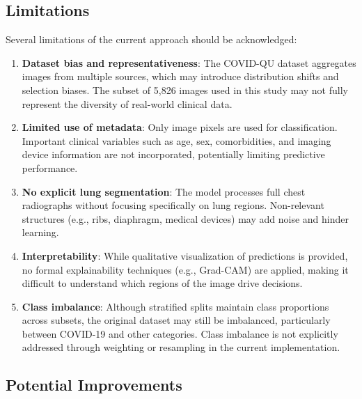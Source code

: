 \documentclass[conference]{IEEEtran}
\begin{document}
\subsection{Limitations}

Several limitations of the current approach should be acknowledged:
\begin{enumerate}
    \item \textbf{Dataset bias and representativeness}: The COVID-QU dataset aggregates images from multiple sources, which may introduce distribution shifts and selection biases. The subset of 5{,}826 images used in this study may not fully represent the diversity of real-world clinical data.
    \item \textbf{Limited use of metadata}: Only image pixels are used for classification. Important clinical variables such as age, sex, comorbidities, and imaging device information are not incorporated, potentially limiting predictive performance.
    \item \textbf{No explicit lung segmentation}: The model processes full chest radiographs without focusing specifically on lung regions. Non-relevant structures (e.g., ribs, diaphragm, medical devices) may add noise and hinder learning.
    \item \textbf{Interpretability}: While qualitative visualization of predictions is provided, no formal explainability techniques (e.g., Grad-CAM) are applied, making it difficult to understand which regions of the image drive decisions.
    \item \textbf{Class imbalance}: Although stratified splits maintain class proportions across subsets, the original dataset may still be imbalanced, particularly between COVID-19 and other categories. Class imbalance is not explicitly addressed through weighting or resampling in the current implementation.
\end{enumerate}

\subsection{Potential Improvements}
\end{document}
